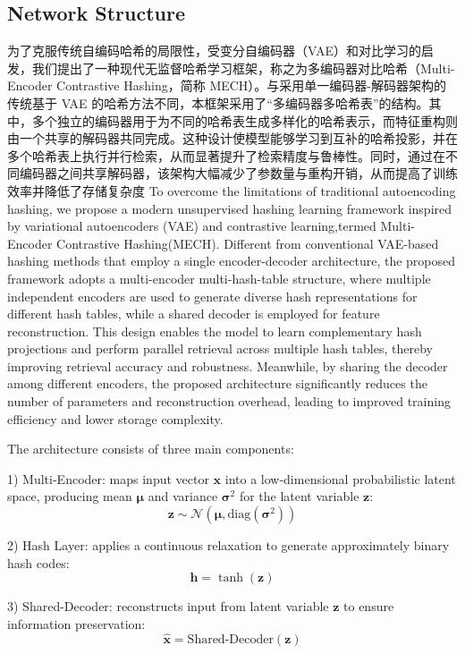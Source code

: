 \documentclass[conference]{IEEEtran}
\begin{document}
\subsection{Network Structure}
为了克服传统自编码哈希的局限性，受变分自编码器（VAE）和对比学习的启发，我们提出了一种现代无监督哈希学习框架，称之为多编码器对比哈希（Multi-Encoder Contrastive Hashing，简称 MECH）。与采用单一编码器-解码器架构的传统基于 VAE 的哈希方法不同，本框架采用了“多编码器多哈希表”的结构。其中，多个独立的编码器用于为不同的哈希表生成多样化的哈希表示，而特征重构则由一个共享的解码器共同完成。这种设计使模型能够学习到互补的哈希投影，并在多个哈希表上执行并行检索，从而显著提升了检索精度与鲁棒性。同时，通过在不同编码器之间共享解码器，该架构大幅减少了参数量与重构开销，从而提高了训练效率并降低了存储复杂度
To overcome the limitations of traditional autoencoding hashing, we propose a modern unsupervised hashing learning framework inspired by variational autoencoders (VAE) and contrastive learning,termed Multi-Encoder Contrastive Hashing(MECH). Different from conventional VAE-based hashing methods that employ a single encoder-decoder architecture, the proposed framework adopts a multi-encoder multi-hash-table structure, where multiple independent encoders are used to generate diverse hash representations for different hash tables, while a shared decoder is employed for feature reconstruction. This design enables the model to learn complementary hash projections and perform parallel retrieval across multiple hash tables, thereby improving retrieval accuracy and robustness. Meanwhile, by sharing the decoder among different encoders, the proposed architecture significantly reduces the number of parameters and reconstruction overhead, leading to improved training efficiency and lower storage complexity.

The architecture consists of three main components:

1) Multi-Encoder: maps input vector $\mathbf{x}$ into a low-dimensional probabilistic latent space, producing mean $\boldsymbol{\mu}$ and variance $\boldsymbol{\sigma}^2$ for the latent variable $\mathbf{z}$:
\[
\mathbf{z} \sim \mathcal{N}(\boldsymbol{\mu}, \text{diag}(\boldsymbol{\sigma}^2))
\]

2) Hash Layer: applies a continuous relaxation to generate approximately binary hash codes:
\[
\mathbf{h} = \tanh(\mathbf{z})
\]

3) Shared-Decoder: reconstructs input from latent variable $\mathbf{z}$ to ensure information preservation:
\[
\hat{\mathbf{x}} = \text{Shared-Decoder}(\mathbf{z})
\]
\end{document}
